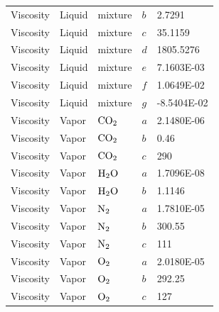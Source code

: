 \documentclass[a4paper,fleqn]{cas-sc}
\begin{document}
\begin{longtable}{lllll}
        Viscosity                 & Liquid         & mixture             & $b$               & 2.7291         \\
        Viscosity                 & Liquid         & mixture             & $c$               & 35.1159        \\
        Viscosity                 & Liquid         & mixture             & $d$               & 1805.5276      \\
        Viscosity                 & Liquid         & mixture             & $e$               & 7.1603E-03     \\
        Viscosity                 & Liquid         & mixture             & $f$               & 1.0649E-02     \\
        Viscosity                 & Liquid         & mixture             & $g$               & -8.5404E-02    \\
        Viscosity                 & Vapor          & $\ce{CO2}$          & $a$               & 2.1480E-06     \\
        Viscosity                 & Vapor          & $\ce{CO2}$          & $b$               & 0.46           \\
        Viscosity                 & Vapor          & $\ce{CO2}$          & $c$               & 290            \\
        Viscosity                 & Vapor          & $\ce{H2O}$          & $a$               & 1.7096E-08     \\
        Viscosity                 & Vapor          & $\ce{H2O}$          & $b$               & 1.1146         \\
        Viscosity                 & Vapor          & $\ce{N2}$           & $a$               & 1.7810E-05     \\
        Viscosity                 & Vapor          & $\ce{N2}$           & $b$               & 300.55         \\
        Viscosity                 & Vapor          & $\ce{N2}$           & $c$               & 111            \\
        Viscosity                 & Vapor          & $\ce{O2}$           & $a$               & 2.0180E-05     \\
        Viscosity                 & Vapor          & $\ce{O2}$           & $b$               & 292.25         \\
        Viscosity                 & Vapor          & $\ce{O2}$           & $c$               & 127            \\

\end{longtable}
\end{document}
